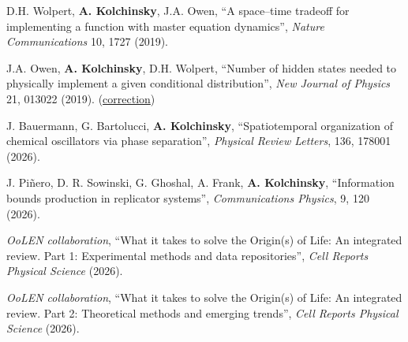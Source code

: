 D.H. Wolpert, \textbf{A. Kolchinsky}, J.A. Owen, ``A space–time tradeoff for implementing a function with master equation dynamics'', \emph{Nature Communications} 10, 1727 (2019).  

J.A. Owen, \textbf{A. Kolchinsky}, D.H. Wolpert, ``Number of hidden states needed to physically implement a given conditional distribution'', \emph{New Journal of Physics} 21, 013022 (2019).   (\href{https://iopscience.iop.org/article/10.1088/1367-2630/ab60f8}{correction})



\vspace{15pt}

J. Bauermann, G. Bartolucci, \textbf{A. Kolchinsky}, ``Spatiotemporal organization of chemical oscillators via phase separation'', \emph{Physical Review Letters}, 136, 178001 (2026).   %

J. Piñero, D. R. Sowinski, G. Ghoshal, A. Frank, \textbf{A. Kolchinsky}\CA, ``Information bounds production in replicator systems'', \emph{Communications Physics}, 9, 120 (2026).  

\emph{OoLEN collaboration}, ``What it takes to solve the Origin(s) of Life: An integrated review. Part 1: Experimental methods and data repositories'', \emph{Cell Reports Physical Science} (2026).  

\emph{OoLEN collaboration}, ``What it takes to solve the Origin(s) of Life: An integrated review. Part 2: Theoretical methods and emerging trends'', \emph{Cell Reports Physical Science} (2026).  

